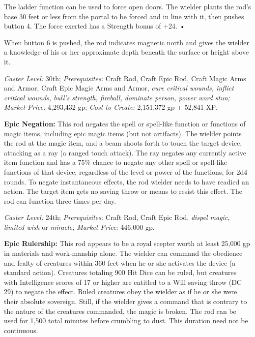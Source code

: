 \documentclass{article}
\begin{document}
The ladder function can be used to force open doors. The wielder plants the rod's 
base 30 feet or less from the portal to be forced and in line with it, then pushes 
button 4. The force exerted has a Strength bonus of +24. • 

\parindent=7pt
When button 6 is pushed, the rod indicates magnetic north and gives the wielder 
a knowledge of his or her approximate depth beneath the surface or height above 
it. 

\parindent=0pt
\textit{Caster Level: }30th; \textit{Prerequisites: }Craft Rod, Craft Epic Rod, 
Craft Magic Arms and Armor, Craft Epic Magic Arms and Armor, \textit{cure critical 
wounds, inflict critical wounds, bull's strength, fireball, dominate person, power 
word stun; Market Price: }4,293,432 gp; \textit{Cost to Create: }2,151,372 gp + 
52,841 XP. 

\textbf{Epic Negation: }This rod negates the spell or spell-like function or functions 
of magic items, including epic magic items (but not artifacts). The wielder points 
the rod at the magic item, and a beam shoots forth to touch the target device, 
attacking as a ray (a ranged touch attack). The ray negates any currently active 
item function and has a 75\% chance to negate any other spell or spell-like functions 
of that device, regardless of the level or power of the functions, for 2d4 rounds. 
To negate instantaneous effects, the rod wielder needs to have readied an action. 
The target item gets no saving throw or means to resist this effect. The rod can 
function three times per day. 

\textit{Caster Level: }24th; \textit{Prerequisites: }Craft Rod, Craft Epic Rod, 
\textit{dispel magic, limited wish }or \textit{miracle; Market Price: }446,000 
gp. 

\textbf{Epic Rulership: }This rod appears to be a royal scepter worth at least 
25,000 gp in materials and work-manship alone. The wielder can command the obedience 
and fealty of creatures within 360 feet when he or she activates the device (a 
standard action). Creatures totaling 900 Hit Dice can be ruled, but creatures with 
Intelligence scores of 17 or higher are entitled to a Will saving throw (DC 29) 
to negate the effect. Ruled creatures obey the wielder as if he or she were their 
absolute sovereign. Still, if the wielder gives a command that is contrary to the 
nature of the creatures commanded, the magic is broken. The rod can be used for 
1,500 total minutes before crumbling to dust. This duration need not be continuous. 
\end{document}
